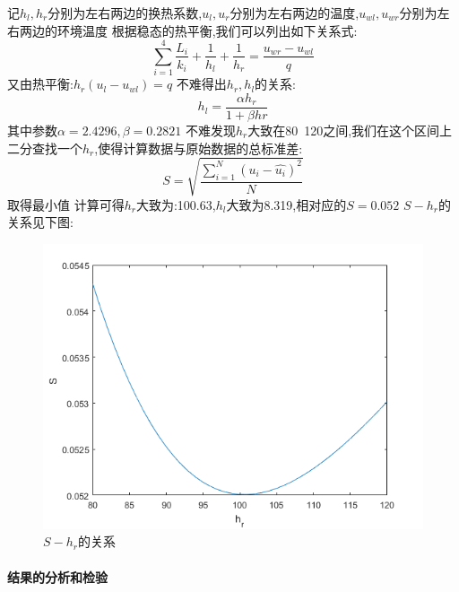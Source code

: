 \documentclass{cumcmthesis}
\begin{document}
            记\(h_l,h_r\)分别为左右两边的换热系数,\(u_l,u_r\)分别为左右两边的温度,\(u_{wl},u_{wr}\)分别为左右两边的环境温度
            根据稳态的热平衡,我们可以列出如下关系式:
            \[\sum_{i=1}^4 \frac{L_i}{k_i} + \frac{1}{h_l} + \frac{1}{h_r} = \frac{u_{wr}-u_{wl}}{q}\]
            又由热平衡:\( h_r(u_l-u_{wl}) = q\)
            不难得出\(h_r,h_l\)的关系:
            \[h_l = \frac{\alpha h_r}{1+\beta hr}\]
            其中参数\(\alpha = 2.4296 ,\beta = 0.2821\)
            不难发现\(h_r\)大致在80~120之间,我们在这个区间上二分查找一个\(h_r\),使得计算数据与原始数据的总标准差:
            \[S = \sqrt{\frac{\sum_{i=1}^{N}(u_i-\hat{u_i})^2}{N}}\]
            取得最小值
            计算可得\(h_r\)大致为:100.63,\(h_l\)大致为8.319,相对应的\(S = 0.052\)
            \(S-h_r\)的关系见下图:
            \begin{figure}[ht] 
                \centering 
                \includegraphics[scale=0.9]{../figure/ques1Optimization.png} 
                \caption{\(S-h_r\)的关系}\label{optimization}    
            \end{figure}
        \paragraph{结果的分析和检验}
\end{document}
